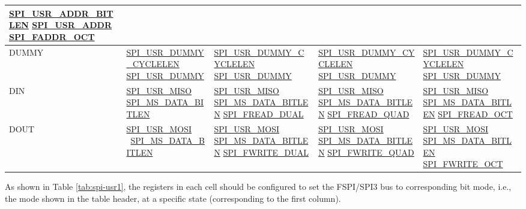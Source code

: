 \documentclass[main\_\_EN.tex]{subfiles}
\begin{document}
\begin{landscape}
\begin{longtable}[c]{ |L{1.3cm}|L{4.8cm}|L{4.8cm}|L{4.8cm}|L{4.8cm}| }
        \hyperref[fielddesc:SPIUSRADDRBITLEN]{SPI\_USR\_ADDR\_BITLEN}    \hyperref[fielddesc:SPIUSRADDR]{SPI\_USR\_ADDR}      \hyperref[fielddesc:SPIFADDROCT]{SPI\_FADDR\_OCT}
     \\\hline
DUMMY&\hyperref[fielddesc:SPIUSRDUMMYCYCLELEN]{SPI\_USR\_DUMMY\_CYCLELEN}
      \hyperref[fielddesc:SPIUSRDUMMY]{SPI\_USR\_DUMMY}
     &\hyperref[fielddesc:SPIUSRDUMMYCYCLELEN]{SPI\_USR\_DUMMY\_CYCLELEN}     \hyperref[fielddesc:SPIUSRDUMMY]{SPI\_USR\_DUMMY} &
     \hyperref[fielddesc:SPIUSRDUMMYCYCLELEN]{SPI\_USR\_DUMMY\_CYCLELEN}     \hyperref[fielddesc:SPIUSRDUMMY]{SPI\_USR\_DUMMY} &\hyperref[fielddesc:SPIUSRDUMMYCYCLELEN]{SPI\_USR\_DUMMY\_CYCLELEN}
      \hyperref[fielddesc:SPIUSRDUMMY]{SPI\_USR\_DUMMY}
     \\\hline
DIN  &\hyperref[fielddesc:SPIUSRMISO]{SPI\_USR\_MISO}
      \hyperref[fielddesc:SPIMSDATABITLEN]{SPI\_MS\_DATA\_BITLEN}
     &\hyperref[fielddesc:SPIUSRMISO]{SPI\_USR\_MISO}
     \hyperref[fielddesc:SPIMSDATABITLEN]{SPI\_MS\_DATA\_BITLEN}
     \hyperref[fielddesc:SPIFREADDUAL]{SPI\_FREAD\_DUAL}
     &\hyperref[fielddesc:SPIUSRMISO]{SPI\_USR\_MISO}
     \hyperref[fielddesc:SPIMSDATABITLEN]{SPI\_MS\_DATA\_BITLEN}
     \hyperref[fielddesc:SPIFREADQUAD]{SPI\_FREAD\_QUAD}&\hyperref[fielddesc:SPIUSRMISO]{SPI\_USR\_MISO}
     \hyperref[fielddesc:SPIMSDATABITLEN]{SPI\_MS\_DATA\_BITLEN}
     \hyperref[fielddesc:SPIFREADOCT]{SPI\_FREAD\_OCT}\\
     \hline
DOUT &\hyperref[fielddesc:SPIUSRMOSI]{SPI\_USR\_MOSI}       \
      \hyperref[fielddesc:SPIMSDATABITLEN]{SPI\_MS\_DATA\_BITLEN}
     &\hyperref[fielddesc:SPIUSRMOSI]{SPI\_USR\_MOSI}
     \hyperref[fielddesc:SPIMSDATABITLEN]{SPI\_MS\_DATA\_BITLEN}       \hyperref[fielddesc:SPIFWRITEDUAL]{SPI\_FWRITE\_DUAL} &
     \hyperref[fielddesc:SPIUSRMOSI]{SPI\_USR\_MOSI}
     \hyperref[fielddesc:SPIMSDATABITLEN]{SPI\_MS\_DATA\_BITLEN}       \hyperref[fielddesc:SPIFWRITEQUAD]{SPI\_FWRITE\_QUAD} & \hyperref[fielddesc:SPIUSRMOSI]{SPI\_USR\_MOSI}
     \hyperref[fielddesc:SPIMSDATABITLEN]{SPI\_MS\_DATA\_BITLEN}       \hyperref[fielddesc:SPIFWRITEOCT]{SPI\_FWRITE\_OCT}\\
     \hline
\end{longtable}
\end{landscape}

As shown in Table \ref{tab:spi-usr1}, the registers in each cell should be configured to set the FSPI/SPI3 bus to corresponding bit mode, i.e., the mode shown in the table header, at a specific state (corresponding to the first column).
\end{document}
